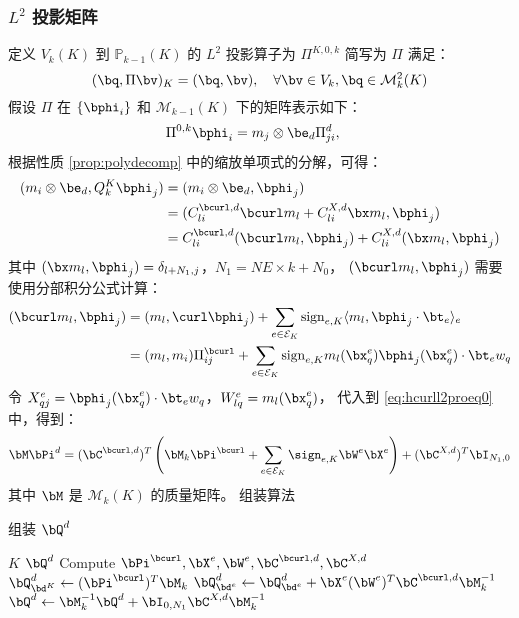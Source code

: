 \subsubsection{$L^2$ 投影矩阵}
定义 $V_k(K)$ 到 $\mathbb{P}_{k-1}(K)$ 的 $L^2$ 投影算子为 $\Pi^{K, 0, k}$
简写为 $\Pi$ 满足：
$$
(\bq, \Pi\bv)_K = (\bq, \bv), \quad \forall \bv \in V_k, \bq \in 
\mathcal{M}_{k}^2(K)
$$
假设 $\Pi$
在 $\{\bphi_i\}$ 和 $\mathcal{M}_{k-1}(K)$ 下的矩阵表示如下：
$$
\Pi^{0, k} \bphi_i = m_j\otimes \be_d \Pi^d_{ji}, \quad 
$$
根据性质 \eqref{prop:polydecomp} 中的缩放单项式的分解，可得：
\begin{equation}
\label{eq:hcurll2proeq0}
\begin{aligned}
    (m_i\otimes \be_d, Q_k^{K}\bphi_j) & = (m_i\otimes \be_d, \bphi_j)\\
    & = (C^{\bcurl, d}_{li}\bcurl m_l + C^{X, d}_{li}\bx m_l, \bphi_j)\\
    & = C^{\bcurl, d}_{li}(\bcurl m_l, \bphi_j) + C^{X, d}_{li}(\bx m_l, \bphi_j)\\
\end{aligned}
\end{equation}
其中 $(\bx m_l, \bphi_j) = \delta_{l+N_1, j}$，$N_1 = NE \times k + N_0$，
$(\bcurl m_l, \bphi_j)$ 需要使用分部积分公式计算：
$$
\begin{aligned}
(\bcurl m_l, \bphi_j) & = (m_l, \curl \bphi_j) + \sum_{e\in \mathcal{E}_K}
\mathrm{sign}_{e, K}\langle m_l, \bphi_j\cdot\bt_e \rangle_e\\
& = (m_l, m_i)\Pi_{ij}^{\bcurl} +
\sum_{e\in \mathcal{E}_K}\mathrm{sign}_{e, K}m_l(\bx_q^e)\bphi_j(\bx_q^e)\cdot \bt_e
w_q
\end{aligned}
$$
令 $X^e_{qj} = \bphi_j(\bx_q^e)\cdot \bt_e w_q$，$W^e_{lq} = m_l(\bx_q^e)$，
代入到 \eqref{eq:hcurll2proeq0} 中，得到：
$$
\bM\bPi^d = (\bC^{\bcurl, d})^T\left(\bM_{k}\bPi^{\bcurl} + \sum_{e\in \mathcal{E}_K} 
\sign_{e,K}\bW^e\bX^e\right) + (\bC^{X, d})^T\bI_{N_1, 0}
$$
其中 $\bM$ 是 $\mathcal{M}_k(K)$ 的质量矩阵。
组装算法
\begin{algorithm}
\caption{组装 $\bQ^d$}\label{alg:assembleQd}
\begin{algorithmic}[1]
\Require $K$
\Ensure $\bQ^d$
\State Compute $\bPi^{\bcurl}, \bX^e, \bW^e, \bC^{\bcurl, d}, \bC^{X, d}$
\State $\bQ^d_{\bd^K} \gets (\bPi^{\bcurl})^T\bM_{k}$
    \State $\bQ^d_{\bd^e} \gets \bQ^d_{\bd^e} + \bX^e (\bW^e)^T\bC^{\bcurl, d}\bM_k^{-1}$
\EndFor
\State $\bQ^d \gets \bM_k^{-1}\bQ^d + \bI_{0, N_1}\bC^{X, d} \bM_k^{-1}$
\end{algorithmic}
\end{algorithm}

